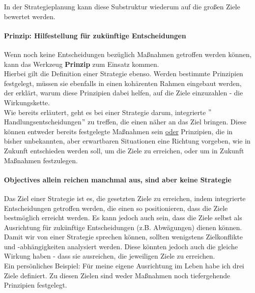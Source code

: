 In der Strategieplanung kann diese Substruktur wiederum auf die großen Ziele bewertet werden.

\paragraph{Prinzip: Hilfestellung für zukünftige Entscheidungen} \label{Rubic:Prinzip}

Wenn noch keine Entscheidungen bezüglich Maßnahmen getroffen werden können, kann das Werkzeug \textbf{Prinzip} zum Einsatz kommen.\\

Hierbei gilt die Definition einer Strategie ebenso. Werden bestimmte Prinzipien festgelegt, müssen sie ebenfalls in einen kohärenten Rahmen eingebaut werden, der erklärt, warum diese Prinzipien dabei helfen, auf die Ziele einzuzahlen - die Wirkungskette.\\

Wie bereits erläutert, geht es bei einer Strategie darum, integrierte $"$Handlungsentscheidungen$"$ zu treffen, die einen näher an das Ziel bringen. Diese können entweder bereits festgelegte Maßnahmen sein \underline{oder} Prinzipien, die in bisher unbekannten, aber erwartbaren Situationen eine Richtung vorgeben, wie in Zukunft entschieden werden soll, um die Ziele zu erreichen, oder um in Zukunft Maßnahmen festzulegen.

\paragraph{Objectives allein reichen manchmal aus, sind aber keine Strategie}

Das Ziel einer Strategie ist es, die gesetzten Ziele zu erreichen, indem integrierte Entscheidungen getroffen werden, die einen so positionieren, dass die Ziele bestmöglich erreicht werden. Es kann jedoch auch sein, dass die Ziele selbst als Ausrichtung für zukünftige Entscheidungen (z.B. Abwägungen) dienen können.\\

Damit wir von einer Strategie sprechen können, sollten wenigstens Zielkonflikte und -abhängigkeiten analysiert werden. Diese könnten jedoch auch die gleiche Wirkung haben - dass sie ausreichen, die jeweiligen Ziele zu erreichen.\\

Ein persönliches Beispiel: Für meine eigene Ausrichtung im Leben habe ich drei Ziele definiert. Zu diesen Zielen sind weder Maßnahmen noch tiefergehende Prinzipien festgelegt.

